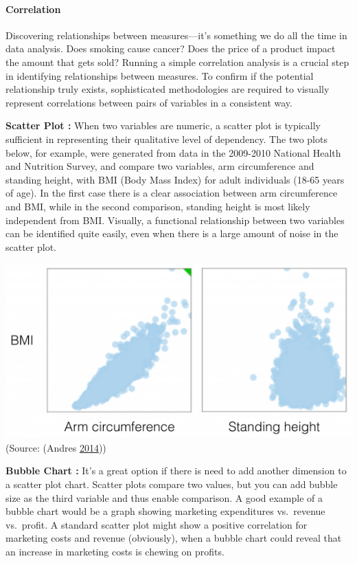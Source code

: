 \documentclass[]{book}
\let\oldparagraph\paragraph
\renewcommand{\paragraph}[1]{\oldparagraph{#1}\mbox{}}
\begin{document}
\hypertarget{correlation}{%
\paragraph{Correlation}\label{correlation}}

Discovering relationships between measures---it's something we do all the time in data analysis. Does smoking cause cancer? Does the price of a product impact the amount that gets sold? Running a simple correlation analysis is a crucial step in identifying relationships between measures. To confirm if the potential relationship truly exists, sophisticated methodologies are required to visually represent correlations between pairs of variables in a consistent way.

\textbf{Scatter Plot :} When two variables are numeric, a scatter plot is typically sufficient in representing their qualitative level of dependency.
The two plots below, for example, were generated from data in the 2009-2010 National Health and Nutrition Survey, and compare two variables, arm circumference and standing height, with BMI (Body Mass Index) for adult individuals (18-65 years of age). In the first case there is a clear association between arm circumference and BMI, while in the second comparison, standing height is most likely independent from BMI. Visually, a functional relationship between two variables can be identified quite easily, even when there is a large amount of noise in the scatter plot.

\includegraphics{images/3.2.2_Scatter_plot.png}
(Source: (Andres \protect\hyperlink{ref-Visualizing_correlations}{2014}))

\textbf{Bubble Chart :} It's a great option if there is need to add another dimension to a scatter plot chart. Scatter plots compare two values, but you can add bubble size as the third variable and thus enable comparison.
A good example of a bubble chart would be a graph showing marketing expenditures vs.~revenue vs.~profit. A standard scatter plot might show a positive correlation for marketing costs and revenue (obviously), when a bubble chart could reveal that an increase in marketing costs is chewing on profits.
\end{document}
